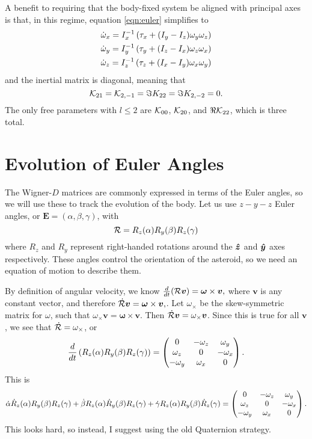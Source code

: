 \documentclass[aps,twocolumn,secnumarabic,balancelastpage,amsmath,amssymb,nofootinbib,floatfix]{revtex4-1}
\begin{document}
A benefit to requiring that the body-fixed system be aligned with principal axes is that, in this regime, equation \ref{eqn:euler} simplifies to
\begin{equation}
\begin{aligned}
\dot \omega_x = I_x^{-1}\left( \tau_x + (I_y - I_z)\omega_y \omega_z \right)\\
\dot \omega_y = I_y^{-1}\left( \tau_y + (I_z - I_x)\omega_z \omega_x \right)\\
\dot \omega_z = I_z^{-1}\left( \tau_z + (I_x - I_y)\omega_x \omega_y \right)\\
\end{aligned}
\end{equation}
and the inertial matrix is diagonal, meaning that
$$\mathcal{K}_{21} = \mathcal{K}_{2,-1}=\Im K_{22} = \Im K_{2,-2}= 0.$$
The only free parameters with $l\leq 2$ are $\mathcal{K}_{00}$, $\mathcal{K}_{20}$, and $\Re \mathcal{K}_{22}$, which is three total.



\section{Evolution of Euler Angles}
The Wigner-$D$ matrices are commonly expressed in terms of the Euler angles, so we will use these to track the evolution of the body. Let us use $z-y-z$ Euler angles, or $\bm E = (\alpha, \beta, \gamma)$, with
\begin{equation}
\mathcal{R} = R_z(\alpha) R_y(\beta) R_z(\gamma)
\label{eqn:euler-angle-rotation}
\end{equation}
where $R_z$ and $R_y$ represent right-handed rotations around the $\bm{\hat z}$ and $\bm{\hat y}$ axes respectively. These angles control the orientation of the asteroid, so we need an equation of motion to describe them.

By definition of angular velocity, we know $\frac{d}{dt}(\mathcal{R} \bm v) = \bm \omega \times \bm v,$ where $\bm v$ is any constant vector, and therefore $\dot {\mathcal{R}} \bm v = \bm \omega \times \bm v,$. Let $\omega_{\times}$ be the skew-symmetric matrix for $\omega$, such that $\omega_{\times} \bm v = \bm\omega \times \bm v$. Then $\dot {\mathcal{R}} \bm v = \omega_\times \bm v$. Since this is true for all $\bm v$, we see that $\dot {\mathcal{R}} = \omega_\times$, or
$$\frac{d}{dt}\left( R_z(\alpha)R_y(\beta)R_z(\gamma) \right) = \left( \begin{matrix}
0 & -\omega_z & \omega_y \\
\omega_z & 0 & -\omega_x \\
-\omega_y & \omega_x & 0
 \end{matrix} \right).$$
 This is
 $$\dot \alpha \dot R_z(\alpha)R_y(\beta)R_z(\gamma) + \dot \beta R_z(\alpha)\dot R_y(\beta)R_z(\gamma) + \dot \gamma R_z(\alpha)R_y(\beta)\dot R_z(\gamma) = \left( \begin{matrix}
 0 & -\omega_z & \omega_y \\
 \omega_z & 0 & -\omega_x \\
 -\omega_y & \omega_x & 0
  \end{matrix} \right).$$
  This looks hard, so instead, I suggest using the old Quaternion strategy.





\end{document}
